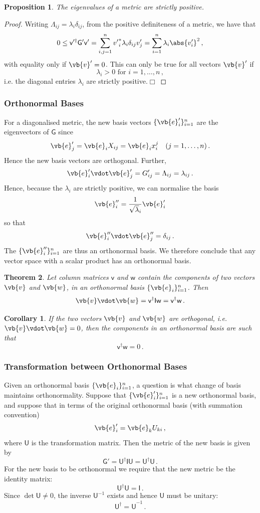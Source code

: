 \documentclass{article}
\theoremstyle{plain}\theoremheaderfont{\normalfont\itshape}\theorembodyfont{\rmfamily}\theoremseparator{.}\newtheorem*{rem}{Remark}\newtheorem*{ex}{Example}\newtheorem*{proof}{Proof}\newtheorem*{altp}{Alternative proof}
\theoremstyle{plain}\theoremheaderfont{\normalfont\bfseries}\theorembodyfont{\rmfamily}\theoremseparator{.}\newtheorem{thm}{Theorem}[section]\newtheorem{lem}[thm]{Lemma}\newtheorem{prop}[thm]{Proposition}\newtheorem*{cor}{Corollary}\newtheorem{defn}[thm]{Definition}\newtheorem{clm}[thm]{Claim}\newtheorem{clminproof}{Claim}
\theoremstyle{break}\theoremheaderfont{\normalfont\itshape}\theorembodyfont{\rmfamily}\theoremseparator{.\medskip}\newtheorem*{proofskip}{Proof}\newtheorem*{exs}{Examples}\newtheorem*{rems}{Remarks}
\theoremstyle{break}\theoremheaderfont{\normalfont\bfseries}\theorembodyfont{\rmfamily}\theoremseparator{.\medskip}\newtheorem{lemskip}[thm]{Lemma}\newtheorem{defnskip}[thm]{Definition}\newtheorem{propskip}[thm]{Proposition}\newtheorem{thmskip}[thm]{Theorem}
\numberwithin{equation}{section}
\newcommand{\qed}{\hfill\ensuremath{\Box}}
\begin{document}
	\begin{prop}
		The eigenvalues of a metric are strictly positive.
	\end{prop}
	\begin{proof}		
		Writing \(\Lambda_{ij}=\lambda_i\delta_{ij}\), from the positive definiteness of a metric, we have that
		\[0\le\mathsf{v'^\dagger G' v'}=\sum_{i,j=1}^{n} {v'}_i^*\lambda_i\delta_{ij}v'_j=\sum_{i=1}^{n}\lambda_i\abs{v'_i}^2\,,\]
		with equality only if \(\vb{v}'=0\). This can only be true for all vectors \(\vb{v}'\) if
		\[\lambda_i>0\text{ for }i=1,\dots,n\,,\]
		i.e. the diagonal entries \(\lambda_i\) are strictly positive.\qed
	\end{proof}
	\subsubsection{Orthonormal Bases}
	For a diagonalised metric, the new basis vectors \(\{\vb{e}'_i\}_{i=1}^n\) are the eigenvectors of \(\mathsf{G}\) since
	\[\vb{e}'_j=\vb{e}_i X_{ij}=\vb{e}_i x^j_i\quad (j=1,\dots,n)\,.\]
	Hence the new basis vectors are orthogonal. Further,
	\[\vb{e}'_i\vdot\vb{e}'_j=G'_{ij}=\Lambda_{ij}=\lambda_{ij}\,.\]
	Hence, because the \(\lambda_i\) are strictly positive, we can normalise the basis
	\[\vb{e}_i''=\frac{1}{\sqrt{\lambda}_i}\vb{e}_i'\]
	so that
	\[\vb{e}_i''\vdot\vb{e}_j''=\delta_{ij}\,.\]
	The \(\{\vb{e}_i''\}_{i=1}^n\) are thus an orthonormal basis. We therefore conclude that any vector space with a scalar product has an orthonormal basis.
	\begin{thm}
		Let column matrices \(\mathsf{v}\) and \(\mathsf{w}\) contain the components of two vectors \(\vb{v}\) and \(\vb{w}\), in an orthonormal basis \(\{\vb{e}_i\}_{i=1}^n\). Then
		\[\vb{v}\vdot\vb{w}=\mathsf{v^\dagger Iw}=\mathsf{v^\dagger w}\,.\]
	\end{thm}
	\begin{cor}
		If the two vectors \(\vb{v}\) and \(\vb{w}\) are orthogonal, i.e. \(\vb{v}\vdot\vb{w}=0\), then the components in an orthonormal basis are such that
		\[\mathsf{v^\dagger w}=0\,.\]
	\end{cor}
	
	\subsubsection{Transformation between Orthonormal Bases}
	Given an orthonormal basis \(\{\vb{e}_i\}_{i=1}^n\), a question is what change of basis maintains orthonormality. Suppose that \(\{\vb{e}'_i\}_{i=1}^n\) is a new orthonormal basis, and suppose that in terms of the original orthonormal basis (with summation convention)
	\[\vb{e}'_i=\vb{e}_k U_{ki}\,,\]
	where \(\mathsf{U}\) is the transformation matrix. Then the metric of the new basis is given by
	\[\mathsf{G'=U^\dagger IU=U^\dagger U}\,.\]
	For the new basis to be orthonormal we require that the new metric be the identity matrix:
	\[\mathsf{U^\dagger U=I}\,.\]
	Since \(\det\mathsf{U}\ne 0\), the inverse \(\mathsf{U}^{-1}\) exists and hence \(\mathsf{U}\) must be unitary:
	\[\mathsf{U^\dagger =U}^{-1}\,.\]
	
\end{document}
